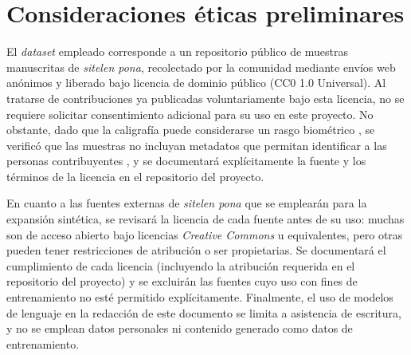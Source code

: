\documentclass[conference]{IEEEtran}
\begin{document}
\section{Consideraciones éticas preliminares}
\label{sec:ethics}
El \textit{dataset} empleado corresponde a un repositorio público de
muestras manuscritas de \textit{sitelen pona}, recolectado por la
comunidad mediante envíos web anónimos y liberado bajo licencia de
dominio público (CC0 1.0 Universal). Al tratarse de contribuciones ya
publicadas voluntariamente bajo esta licencia, no se requiere solicitar
consentimiento adicional para su uso en este proyecto. No obstante, dado
que la caligrafía puede considerarse un rasgo biométrico
\cite{hcrnet_2024}, se verificó que las muestras no incluyan metadatos
que permitan identificar a las personas contribuyentes , y se documentará explícitamente la
fuente y los términos de la licencia en el repositorio del proyecto.

En cuanto a las fuentes externas de \textit{sitelen pona} que se emplearán
para la expansión sintética, se revisará la licencia de cada fuente antes de
su uso: muchas son de acceso abierto bajo licencias \emph{Creative Commons} u
equivalentes, pero otras pueden tener restricciones de atribución o ser
propietarias. Se documentará el cumplimiento de cada licencia (incluyendo la
atribución requerida en el repositorio del proyecto) y se excluirán las
fuentes cuyo uso con fines de entrenamiento no esté permitido explícitamente.
Finalmente, el uso de modelos de lenguaje en la redacción de este documento
se limita a asistencia de escritura, y no se emplean datos personales ni
contenido generado como datos de entrenamiento.



\end{document}
